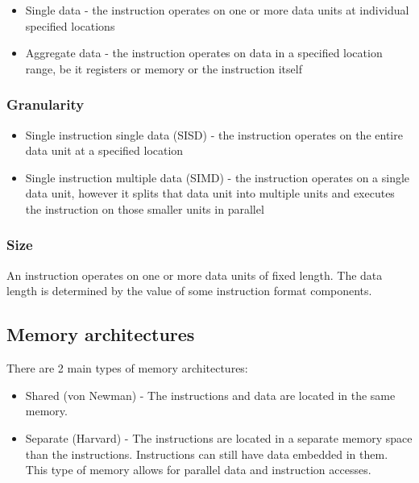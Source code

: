 \documentclass{report}
\begin{document}
\begin{itemize}
    \item{Single data - the instruction operates on one or more data units at
        individual specified locations}
    \item{Aggregate data - the instruction operates on data in a specified
        location range, be it registers or memory or the instruction itself}
\end{itemize}

\subsubsection{Granularity}

\begin{itemize}
    \item{Single instruction single data (SISD) - the instruction operates on
        the entire data unit at a specified location}
    \item{Single instruction multiple data (SIMD) - the instruction operates on
        a single data unit, however it splits that data unit into multiple units
        and executes the instruction on those smaller units in parallel}
\end{itemize}

\subsubsection{Size}

An instruction operates on one or more data units of fixed length. The data
length is determined by the value of some instruction format components.

\subsection{Memory architectures}

There are 2 main types of memory architectures:

\begin{itemize}
    \item{Shared (von Newman) - The instructions and data are located in the
        same memory.}
    \item{Separate (Harvard) - The instructions are located in a separate memory space
        than the instructions. Instructions can still have data embedded in
        them. This type of memory allows for parallel data and instruction
        accesses. }
\end{itemize}
\end{document}
